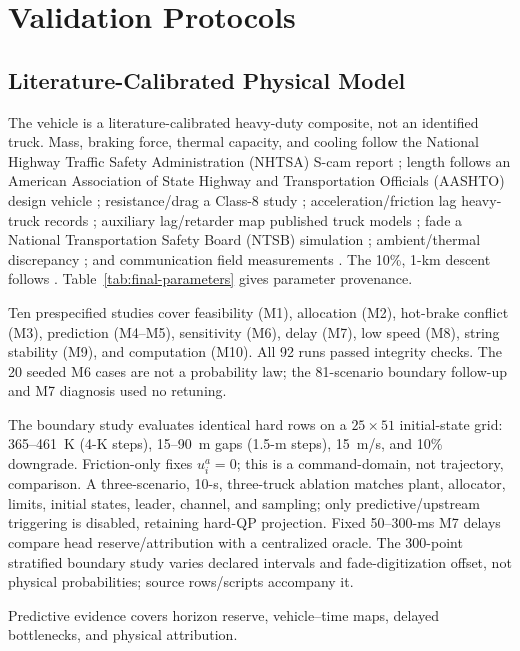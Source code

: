 \section{Validation Protocols}
\subsection{Literature-Calibrated Physical Model}
The vehicle is a literature-calibrated heavy-duty composite, not an identified truck. Mass, braking force, thermal capacity, and cooling follow the National Highway Traffic Safety Administration (NHTSA) S-cam report \cite{nhtsa2010scam}; length follows an American Association of State Highway and Transportation Officials (AASHTO) design vehicle \cite{aashto2004}; resistance/drag a Class-8 study \cite{wang2015fuel}; acceleration/friction lag heavy-truck records \cite{vegamoor2018,yanakiev1998}; auxiliary lag/retarder map published truck models \cite{li2026retarder,donkers2020powertrain}; fade a National Transportation Safety Board (NTSB) simulation \cite{ntsb2002simulation}; ambient/thermal discrepancy \cite{yan2018thermal}; and communication field measurements \cite{hu2021delay,gao2016dsrc}. The 10\%, 1-km descent follows \cite{devika2022fade}. Table~\ref{tab:final-parameters} gives parameter provenance.



Ten prespecified studies cover feasibility (M1), allocation (M2), hot-brake conflict (M3), prediction (M4--M5), sensitivity (M6), delay (M7), low speed (M8), string stability (M9), and computation (M10). All 92 runs passed integrity checks. The 20 seeded M6 cases are not a probability law; the 81-scenario boundary follow-up and M7 diagnosis used no retuning.

The boundary study evaluates identical hard rows on a $25\times51$ initial-state grid: 365--461~K (4-K steps), 15--90~m gaps (1.5-m steps), 15~m/s, and 10\% downgrade. Friction-only fixes $u_i^a=0$; this is a command-domain, not trajectory, comparison. A three-scenario, 10-s, three-truck ablation matches plant, allocator, limits, initial states, leader, channel, and sampling; only predictive/upstream triggering is disabled, retaining hard-QP projection. Fixed 50--300-ms M7 delays compare head reserve/attribution with a centralized oracle. The 300-point stratified boundary study varies declared intervals and fade-digitization offset, not physical probabilities; source rows/scripts accompany it.

Predictive evidence covers horizon reserve, vehicle--time maps, delayed bottlenecks, and physical attribution.

